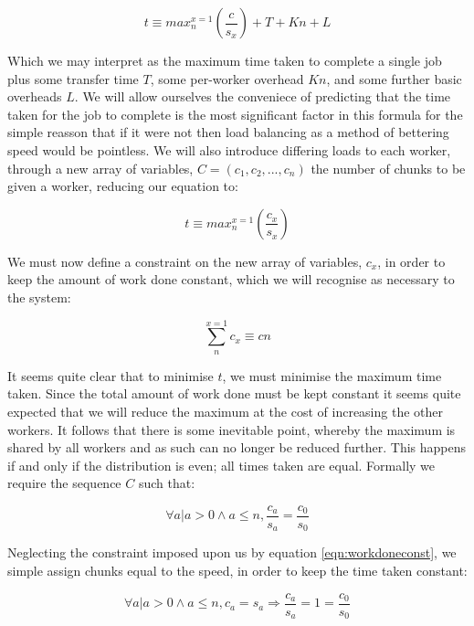 \begin{equation}
t \equiv max^{x=1}_n(\frac{c}{s_x}) + T + Kn + L
\end{equation}

Which we may interpret as the maximum time taken to complete a single job plus some transfer time $T$, some per-worker overhead $Kn$, and some further basic overheads $L$. We will allow ourselves the conveniece of predicting that the time taken for the job to complete is the most significant factor in this formula for the simple reasson that if it were not then load balancing as a method of bettering speed would be pointless. We will also introduce differing loads to each worker, through a new array of variables, $C = (c_1, c_2,...,c_n)$ the number of chunks to be given a worker, reducing our equation to:

\begin{equation}
t \equiv max^{x=1}_n(\frac{c_x}{s_x})
\end{equation}

We must now define a constraint on the new array of variables, $c_x$, in order to keep the amount of work done constant, which we will recognise as necessary to the system:

\begin{equation}\label{eqn:workdoneconst}
\sum^{x=1}_n c_x \equiv cn
\end{equation} 

It seems quite clear that to minimise $t$, we must minimise the maximum time taken. Since the total amount of work done must be kept constant it seems quite expected that we will reduce the maximum at the cost of increasing the other workers. It follows that there is some inevitable point, whereby the maximum is shared by all workers and as such can no longer be reduced further. This happens if and only if the distribution is even; all times taken are equal. Formally we require the sequence $C$ such that:

\begin{equation}
\forall a | a > 0 \wedge a \leq n, \frac{c_a}{s_a} = \frac{c_0}{s_0}
\end{equation} 

Neglecting the constraint imposed upon us by equation \ref{eqn:workdoneconst}, we simple assign chunks equal to the speed, in order to keep the time taken constant:

\begin{equation}
\forall a | a > 0 \wedge a \leq n, c_a = s_a \Rightarrow \frac{c_a}{s_a} = 1 = \frac{c_0}{s_0}
\end{equation}

